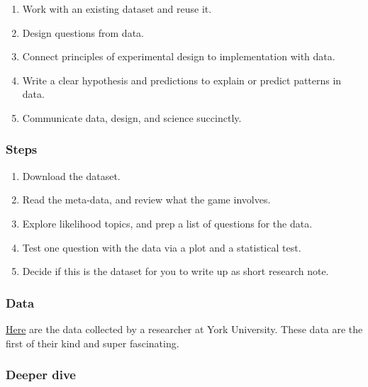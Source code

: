 \documentclass[
]{book}
\providecommand{\tightlist}{%
  \setlength{\itemsep}{0pt}\setlength{\parskip}{0pt}}
\begin{document}
\begin{enumerate}
\def\labelenumi{\arabic{enumi}.}
\tightlist
\item
  Work with an existing dataset and reuse it.\\
\item
  Design questions from data.\\
\item
  Connect principles of experimental design to implementation with data.\\
\item
  Write a clear hypothesis and predictions to explain or predict patterns in data.\\
\item
  Communicate data, design, and science succinctly.
\end{enumerate}

\hypertarget{steps}{%
\subsubsection*{Steps}\label{steps}}

\begin{enumerate}
\def\labelenumi{\arabic{enumi}.}
\tightlist
\item
  Download the dataset.\\
\item
  Read the meta-data, and review what the game involves.\\
\item
  Explore likelihood topics, and prep a list of questions for the data.
\item
  Test one question with the data via a plot and a statistical test.\\
\item
  Decide if this is the dataset for you to write up as short research note.
\end{enumerate}

\hypertarget{data}{%
\subsubsection*{Data}\label{data}}

\href{https://figshare.com/articles/dataset/Magic_The_Gathering_Data/12797474}{Here} are the data collected by a researcher at York University. These data are the first of their kind and super fascinating.

\hypertarget{deeper-dive}{%
\subsubsection*{Deeper dive}\label{deeper-dive}}
\end{document}
